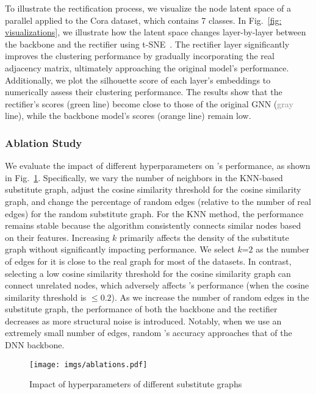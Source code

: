 To illustrate the rectification process, we visualize the node latent space of a parallel \mymethod applied to the Cora dataset, which contains 7 classes. In Fig.~\ref{fig: visualizations}, we illustrate how the latent space changes layer-by-layer between the backbone and the rectifier using t-SNE~\cite{van2008visualizing}. The rectifier layer significantly improves the clustering performance by gradually incorporating the real adjacency matrix, ultimately approaching the original model's performance. Additionally, we plot the silhouette score of each layer's embeddings to numerically assess their clustering performance. The results show that the rectifier's scores (\textcolor{green!40}{green} line) become close to those of the original GNN (\textcolor{gray}{gray} line), while the backbone model's scores (\textcolor{orange!40}{orange} line) remain low.


\subsubsection{Ablation Study}\label{exp: ablation}
We evaluate the impact of different hyperparameters on \mymethod's performance, as shown in Fig.~\ref{fig: ablations}. Specifically, we vary the number of neighbors in the KNN-based substitute graph, adjust the cosine similarity threshold for the cosine similarity graph, and change the percentage of random edges (relative to the number of real edges) for the random substitute graph.
For the KNN method, the performance remains stable because the algorithm consistently connects similar nodes based on their features. Increasing $k$ primarily affects the density of the substitute graph without significantly impacting performance. We select $k$=$2$ as the number of edges for it is close to the real graph for most of the datasets. In contrast, selecting a low cosine similarity threshold for the cosine similarity graph can connect unrelated nodes, which adversely affects \mymethod's performance (when the cosine similarity threshold is $\leq 0.2$). As we increase the number of random edges in the substitute graph, the performance of both the backbone and the rectifier decreases as more structural noise is introduced. Notably, when we use an extremely small number of edges, random \mymethod's accuracy approaches that of the DNN backbone.

\begin{figure}[t]
    \centering
    \texttt{[image: imgs/ablations.pdf]}
    \caption{Impact of hyperparameters of different substitute graphs}
    \label{fig: ablations}
    \vspace{-2mm}
\end{figure}



